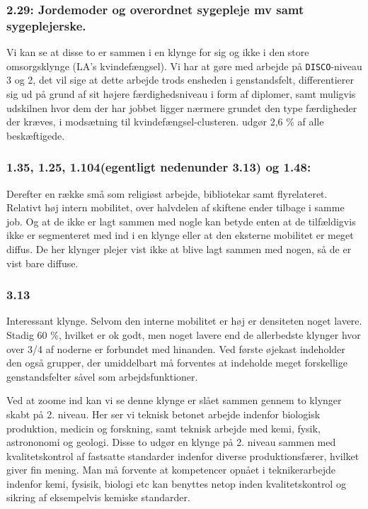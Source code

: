\subsubsection{2.29: Jordemoder og overordnet sygepleje mv samt sygeplejerske.} 

Vi kan se at disse to er sammen i en klynge for sig og ikke i den store omsorgsklynge (LA's kvindefængsel). Vi har at gøre med arbejde på \texttt{DISCO}-niveau 3 og 2, det vil sige at dette arbejde trods ensheden i genstandsfelt, differentierer sig ud på grund af sit højere færdighedsniveau i form af diplomer, samt muligvis udskilnen hvor dem der har jobbet ligger nærmere grundet den type færdigheder der kræves, i modsætning til kvindefængsel-clusteren. udgør 2,6 \% af alle beskæftigede.

\subsubsection{1.35, 1.25, 1.104(egentligt nedenunder 3.13) og 1.48:}

Derefter en række små som religiøst arbejde, bibliotekar samt flyrelateret. Relativt høj intern mobilitet, over halvdelen af skiftene ender tilbage i samme job. Og at de ikke er lagt sammen med nogle kan betyde enten at de tilfældigvis ikke er segmenteret med ind i en klynge eller at den eksterne mobilitet er meget diffus. De her klynger plejer vist ikke at blive lagt sammen med nogen, så de er vist bare diffuse.


\subsubsection{3.13}

Interessant klynge. Selvom den interne mobilitet er høj er densiteten noget lavere. Stadig 60 \%, hvilket er ok godt, men noget lavere end de allerbedste klynger hvor over 3/4 af noderne er forbundet med hinanden. Ved første øjekast indeholder den også grupper, der umiddelbart må forventes at indeholde meget forskellige genstandsfelter såvel som arbejdsfunktioner. 

Ved at zoome ind kan vi se denne klynge er slået sammen gennem to klynger skabt på 2. niveau. Her ser vi teknisk betonet arbejde indenfor biologisk produktion, medicin og forskning, samt teknisk arbejde med kemi, fysik, astrononomi og geologi. Disse to udgør en klynge på 2. niveau sammen med  kvalitetskontrol af fastsatte standarder indenfor diverse produktionsfærer, hvilket giver fin mening. Man må forvente at kompetencer opnået i teknikerarbejde indenfor kemi, fysisik, biologi etc kan benyttes netop inden kvalitetskontrol og sikring af eksempelvis kemiske standarder.

